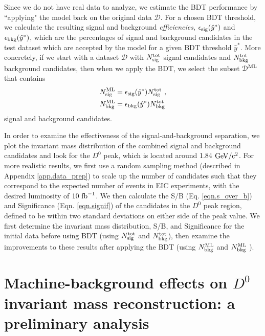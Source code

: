Since we do not have real data to analyze, we estimate the BDT performance by ``applying" the model back on the original data $\mathcal{D}$. For a chosen BDT threshold, we calculate the resulting signal and background {\it efficiencies}, $\epsilon_{\rm{sig}}(\hat{y}^*)$ and $\epsilon_{\rm{bkg}}(\hat{y}^*)$, which are the percentages of signal and background candidates in the test dataset which are accepted by the model for a given BDT threshold $\hat{y}^*$. More concretely, if we start with a dataset $\mathcal{D}$ with $N^{\rm tot}_{\rm sig}$ signal candidates and $N^{\rm tot}_{\rm bkg}$ background candidates, then when we apply the BDT, we select the subset $\mathcal{D}^{\rm ML}$ that contains 
\begin{equation}
\begin{aligned}
    N^{\rm ML}_{\rm sig} &=\epsilon_{\rm sig}(\hat{y}^*) N^{\rm tot}_{\rm sig} \ , \\
    N^{\rm ML}_{\rm bkg} &=\epsilon_{\rm bkg}(\hat{y}^*) N^{\rm tot}_{\rm bkg} \label{eqn.eff}
\end{aligned}
\end{equation}
signal and background candidates.

In order to examine the effectiveness of the signal-and-background separation, we plot the invariant mass distribution of the combined signal and background candidates and look for the $D^0$ peak, which is located around 1.84 ${\rm GeV/c^2}$. For more realistic results, we first use a random sampling method 
(described in Appendix \ref{app.data_prep}) 
to scale up the number of candidates such that they correspond to the expected number of events in EIC experiments, with the desired luminosity of $10~{\rm fb}^{-1}$. We then calculate the S/B (Eq. \eqref{eqn.s_over_b}) and Significance (Eqn. \eqref{eqn.signif}) of the candidates in the $D^0$ peak region, defined to be within two standard deviations on either side of the peak value. We first determine the invariant mass distribution, S/B, and Significance for the initial data before using BDT (using $N_{\rm sig}^{\rm tot}$ and $N_{\rm bkg}^{\rm tot}$), then examine the improvements to these results after applying the BDT (using $N_{\rm bkg}^{\rm ML}$ and $N_{\rm bkg}^{\rm ML}$ ).

\section{Machine-background effects on $D^0$ invariant mass reconstruction: a preliminary analysis}
\label{sec.results_bkg_study}

